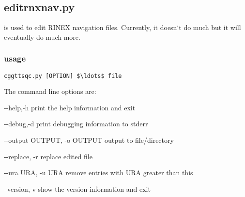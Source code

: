 \subsection{editrnxnav.py}

\hypertarget{h:editrnxnav}{}

 is used to edit RINEX navigation files. Currently, it doesn`t do much
but it will eventually do much more. 

\subsubsection{usage}

\begin{lstlisting}[mathescape=true]
cggttsqc.py [OPTION] $\ldots$ file 
\end{lstlisting}
The command line options are:
\begin{description*}
	\item[-{}-help,-h]	print the help information and exit
	\item[-{}-debug,-d]	print debugging information to stderr
	\item[-{}-output OUTPUT, -o OUTPUT] output to file/directory
  \item[-{}-replace, -r]         replace edited file
  \item[-{}-ura URA, -u URA]     remove entries with URA greater than this
	\item[--version,-v] show the version information and exit
\end{description*}

